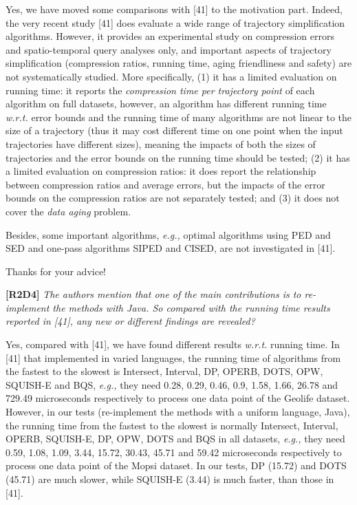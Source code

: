 \documentclass{letter}
\newcommand{\eg}{\emph{e.g.,}\xspace}
\newcommand{\wrt}{\emph{w.r.t.}\xspace}
\begin{document}
{Yes, we have moved some comparisons with [41] to the motivation part. Indeed, the very recent study [41] does evaluate a wide range of trajectory simplification algorithms.
However, it provides {an experimental study} on compression errors and spatio-temporal query analyses only, and important aspects of trajectory simplification (compression ratios, running time, aging friendliness and safety) are not systematically studied. 
{More specifically,}
{(1) it has a limited evaluation on running time: it reports the \emph{compression time per trajectory point} of each algorithm on full datasets, however, an algorithm has different running time \wrt error bounds and the running time of many algorithms are not linear to the size of a trajectory (thus it may cost different time on one point when the input trajectories have different sizes), meaning the impacts of both the sizes of trajectories and the error bounds on the running time should be tested;}
%
{(2) it has a limited evaluation on compression ratios: it does report the relationship between compression ratios and average errors, but the impacts of the error bounds on the compression ratios are not separately tested; and }
%
(3) it does not cover the \emph{data aging} problem.
%
{Besides, some important algorithms, \eg optimal algorithms using PED and SED and one-pass algorithms SIPED and CISED, are not investigated in [41]. 
%


Thanks for your advice!

\textbf{[R2D4]} \emph{The authors mention that one of the main contributions is to re-implement the methods with Java. So compared with the running time results reported in [41], any new or different findings are revealed?}


Yes, compared with [41], we have found different results \wrt running time. 
In [41] that implemented in varied languages, the running time of algorithms from the fastest to the slowest is Intersect, Interval, DP, OPERB, DOTS, OPW, SQUISH-E and BQS, \eg they need 0.28, 0.29, 0.46, 0.9, 1.58, 1.66, 26.78 and 729.49 microseconds respectively to process one data point of the Geolife dataset.
However, in our tests (re-implement the methods with a uniform language, Java), the running time from the fastest to the slowest is normally Intersect, Interval, OPERB, SQUISH-E, DP, OPW, DOTS and BQS in all datasets, \eg they need 0.59, 1.08, 1.09, 3.44, 15.72, 30.43, 45.71 and 59.42 microseconds respectively to process one data point of the Mopsi dataset. In our tests, DP (15.72) and DOTS (45.71) are much slower, while SQUISH-E (3.44) is much faster, than those in [41].


}}
\end{document}
